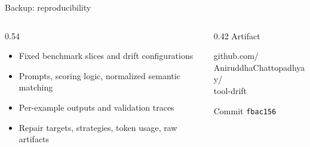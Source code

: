 \documentclass[aspectratio=169,11pt]{beamer}
\newcommand{\lbl}[1]{{\color{Mute}\fontsize{9.5}{12}\selectfont #1}\par}
\begin{document}
\begin{frame}{Backup: reproducibility}
  \vspace{0.26cm}
  \begin{columns}[T,onlytextwidth]
    \begin{column}{0.54\textwidth}
      {\fontsize{10.5}{13.5}\selectfont
      \begin{itemize}\setlength\itemsep{0.16cm}
        \item Fixed benchmark slices and drift configurations
        \item Prompts, scoring logic, normalized semantic matching
        \item Per-example outputs and validation traces
        \item Repair targets, strategies, token usage, raw artifacts
      \end{itemize}}
    \end{column}
    \begin{column}{0.42\textwidth}
      \vspace{0.04cm}
      \lbl{Artifact}
      \vspace{0.18cm}
      {\color{Ink}\ttfamily\fontsize{10}{13.5}\selectfont
        github.com/\\AniruddhaChattopadhyay/\\tool-drift\par}
      \vspace{0.22cm}
      {\color{Mute}\fontsize{9.5}{12}\selectfont Commit \texttt{fbac156}\par}
    \end{column}
  \end{columns}

\end{frame}
\end{document}
